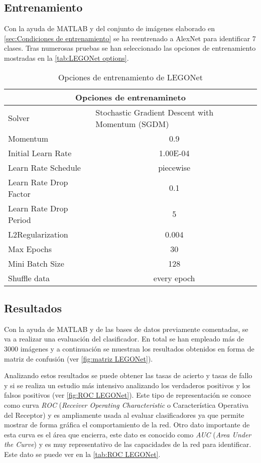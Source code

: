 \subsection{Entrenamiento}
\label{subsec:Entrenamiento LEGONet}
Con la ayuda de MATLAB y del conjunto de imágenes elaborado en \autoref{sec:Condiciones de entrenamiento} se ha reentrenado a AlexNet para identificar 7 clases. Tras numerosas pruebas se han seleccionado las opciones de entrenamiento mostradas en la \autoref{tab:LEGONet options}.

\begin{table}[ht]
  \centering
    \begin{tabular}{|l|c|}
    \hline
    \multicolumn{2}{|c|}{Opciones de entrenamineto} \\
    \hline
    Solver & \multicolumn{1}{l|}{Stochastic Gradient Descent with Momentum (SGDM)} \\
    \hline
    Momentum & 0.9 \\
    \hline
    Initial Learn Rate & 1.00E-04 \\
    \hline
    Learn Rate Schedule & piecewise \\
    \hline
    Learn Rate Drop Factor & 0.1 \\
    \hline
    Learn Rate Drop Period & 5 \\
    \hline
    L2Regularization & 0.004 \\
    \hline
    Max Epochs & 30 \\
    \hline
    Mini Batch Size & 128 \\
    \hline
    Shuffle data & every epoch \\
    \hline
    \end{tabular}%
  \caption{Opciones de entrenamiento de LEGONet}
  \label{tab:LEGONet options}%
\end{table}%

\subsection{Resultados}
Con la ayuda de MATLAB y de las bases de datos previamente comentadas, se va a realizar una evaluación del clasificador. En total se han empleado más de 3000 imágenes y a continuación se muestran los resultados obtenidos en forma de matriz de confusión (ver \autoref{fig:matriz LEGONet}).

Analizando estos resultados se puede obtener las tasas de acierto y tasas de fallo y si se realiza un estudio más intensivo analizando los verdaderos positivos y los falsos positivos (ver \autoref{fig:ROC LEGONet}). Este tipo de representación se conoce como curva \textit{ROC} (\textit{Receiver Operating Characteristic} o Característica Operativa del Receptor) y es ampliamente usada al evaluar clasificadores ya que permite mostrar de forma gráfica el comportamiento de la red. Otro dato importante de esta curva es el área que encierra, este dato es conocido como \textit{AUC} (\textit{Area Under the Curve}) y es muy representativo de las capacidades de la red para identificar. Este dato se puede ver en la \autoref{tab:ROC LEGONet}.

